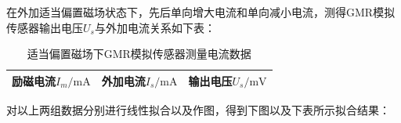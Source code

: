 \documentclass{thuemp}
\begin{document}
在外加适当偏置磁场状态下，先后单向增大电流和单向减小电流，测得GMR模拟传感器输出电压$U_s$与外加电流关系如下表：

\begin{table}[H]
    \centering
    \captionnamefont{\wuhao\bf\heiti}
    \captiontitlefont{\wuhao\bf\heiti}
    \caption{适当偏置磁场下GMR模拟传感器测量电流数据} \label{tab:gmr_current_high}
    \liuhao
    \begin{tabular}{|c|c|c|}
        \toprule
        励磁电流$I_m/\mathrm{mA}$ & 外加电流$I_s/\mathrm{mA}$ & 输出电压$U_s/\mathrm{mV}$ \\ \hline
        \midrule
        \bottomrule
    \end{tabular}
\end{table}

对以上两组数据分别进行线性拟合以及作图，得到下图以及下表所示拟合结果：


\end{document}
